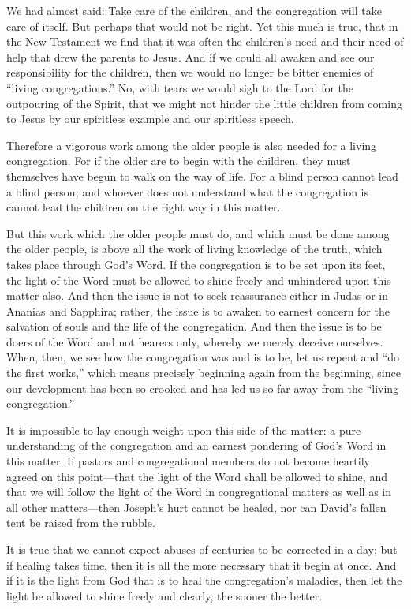 We had almost said: Take care of the children, and the congregation will take care of itself. But perhaps that would not be right. Yet this much is true, that in the New Testament we find that it was often the children’s need and their need of help that drew the parents to Jesus. And if we could all awaken and see our responsibility for the children, then we would no longer be bitter enemies of “living congregations.” No, with tears we would sigh to the Lord for the outpouring of the Spirit, that we might not hinder the little children from coming to Jesus by our spiritless example and our spiritless speech.

Therefore a vigorous work among the older people is also needed for a living congregation. For if the older are to begin with the children, they must themselves have begun to walk on the way of life. For a blind person cannot lead a blind person; and whoever does not understand what the congregation is cannot lead the children on the right way in this matter.

But this work which the older people must do, and which must be done among the older people, is above all the work of living knowledge of the truth, which takes place through God’s Word. If the congregation is to be set upon its feet, the light of the Word must be allowed to shine freely and unhindered upon this matter also. And then the issue is not to seek reassurance either in Judas or in Ananias and Sapphira; rather, the issue is to awaken to earnest concern for the salvation of souls and the life of the congregation. And then the issue is to be doers of the Word and not hearers only, whereby we merely deceive ourselves. When, then, we see how the congregation was and is to be, let us repent and “do the first works,” which means precisely beginning again from the beginning, since our development has been so crooked and has led us so far away from the “living congregation.”

It is impossible to lay enough weight upon this side of the matter: a pure understanding of the congregation and an earnest pondering of God’s Word in this matter. If pastors and congregational members do not become heartily agreed on this point—that the light of the Word shall be allowed to shine, and that we will follow the light of the Word in congregational matters as well as in all other matters—then Joseph’s hurt cannot be healed, nor can David’s fallen tent be raised from the rubble.

It is true that we cannot expect abuses of centuries to be corrected in a day; but if healing takes time, then it is all the more necessary that it begin at once. And if it is the light from God that is to heal the congregation’s maladies, then let the light be allowed to shine freely and clearly, the sooner the better.

